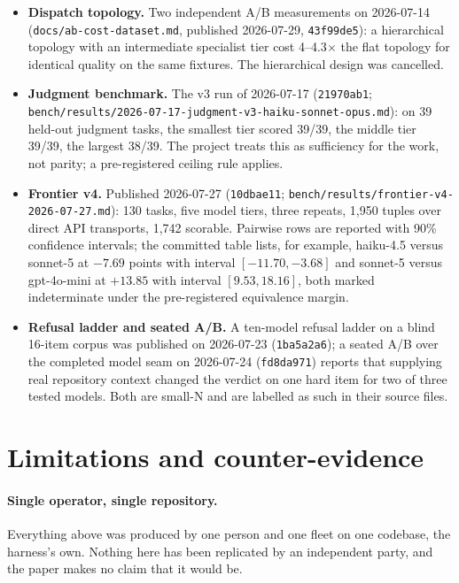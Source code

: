 \documentclass[11pt]{article}
\newcommand{\sha}[1]{\texttt{\small #1}}
\newcommand{\file}[1]{\texttt{\small #1}}
\begin{document}
\begin{itemize}
\item \textbf{Dispatch topology.} Two independent A/B measurements on 2026-07-14 (\file{docs/ab-cost-dataset.md}, published 2026-07-29, \sha{43f99de5}): a hierarchical topology with an intermediate specialist tier cost 4--4.3$\times$ the flat topology for identical quality on the same fixtures. The hierarchical design was cancelled.
\item \textbf{Judgment benchmark.} The v3 run of 2026-07-17 (\sha{21970ab1}; \file{bench/results/2026-07-17-judgment-v3-haiku-sonnet-opus.md}): on 39 held-out judgment tasks, the smallest tier scored 39/39, the middle tier 39/39, the largest 38/39. The project treats this as sufficiency for the work, not parity; a pre-registered ceiling rule applies.
\item \textbf{Frontier v4.} Published 2026-07-27 (\sha{10dbae11}; \file{bench/results/frontier-v4-2026-07-27.md}): 130 tasks, five model tiers, three repeats, 1,950 tuples over direct API transports, 1,742 scorable. Pairwise rows are reported with 90\% confidence intervals; the committed table lists, for example, haiku-4.5 versus sonnet-5 at $-7.69$ points with interval $[-11.70, -3.68]$ and sonnet-5 versus gpt-4o-mini at $+13.85$ with interval $[9.53, 18.16]$, both marked indeterminate under the pre-registered equivalence margin.
\item \textbf{Refusal ladder and seated A/B.} A ten-model refusal ladder on a blind 16-item corpus was published on 2026-07-23 (\sha{1ba5a2a6}); a seated A/B over the completed model seam on 2026-07-24 (\sha{fd8da971}) reports that supplying real repository context changed the verdict on one hard item for two of three tested models. Both are small-N and are labelled as such in their source files.
\end{itemize}

\section{Limitations and counter-evidence}
\label{sec:limits}

\paragraph{Single operator, single repository.} Everything above was produced by one person and one fleet on one codebase, the harness's own. Nothing here has been replicated by an independent party, and the paper makes no claim that it would be.
\end{document}

